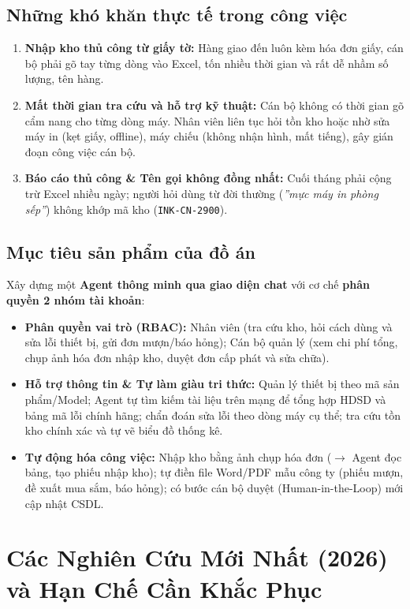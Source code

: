 \documentclass[11pt,a4paper]{article}
\begin{document}
\subsection{Những khó khăn thực tế trong công việc}
\begin{enumerate}
    \item \textbf{Nhập kho thủ công từ giấy tờ:} Hàng giao đến luôn kèm hóa đơn giấy, cán bộ phải gõ tay từng dòng vào Excel, tốn nhiều thời gian và rất dễ nhầm số lượng, tên hàng.
    \item \textbf{Mất thời gian tra cứu và hỗ trợ kỹ thuật:} Cán bộ không có thời gian gõ cẩm nang cho từng dòng máy. Nhân viên liên tục hỏi tồn kho hoặc nhờ sửa máy in (kẹt giấy, offline), máy chiếu (không nhận hình, mất tiếng), gây gián đoạn công việc cán bộ.
    \item \textbf{Báo cáo thủ công \& Tên gọi không đồng nhất:} Cuối tháng phải cộng trừ Excel nhiều ngày; người hỏi dùng từ đời thường (\textit{''mực máy in phòng sếp''}) không khớp mã kho (\texttt{INK-CN-2900}).
\end{enumerate}

\subsection{Mục tiêu sản phẩm của đồ án}
Xây dựng một \textbf{Agent thông minh qua giao diện chat} với cơ chế \textbf{phân quyền 2 nhóm tài khoản}:
\begin{itemize}
    \item \textbf{Phân quyền vai trò (RBAC):} Nhân viên (tra cứu kho, hỏi cách dùng và sửa lỗi thiết bị, gửi đơn mượn/báo hỏng); Cán bộ quản lý (xem chi phí tổng, chụp ảnh hóa đơn nhập kho, duyệt đơn cấp phát và sửa chữa).
    \item \textbf{Hỗ trợ thông tin \& Tự làm giàu tri thức:} Quản lý thiết bị theo mã sản phẩm/Model; Agent tự tìm kiếm tài liệu trên mạng để tổng hợp HDSD và bảng mã lỗi chính hãng; chẩn đoán sửa lỗi theo dòng máy cụ thể; tra cứu tồn kho chính xác và tự vẽ biểu đồ thống kê.
    \item \textbf{Tự động hóa công việc:} Nhập kho bằng ảnh chụp hóa đơn ($\rightarrow$ Agent đọc bảng, tạo phiếu nhập kho); tự điền file Word/PDF mẫu công ty (phiếu mượn, đề xuất mua sắm, báo hỏng); có bước cán bộ duyệt (Human-in-the-Loop) mới cập nhật CSDL.
\end{itemize}

\section{Các Nghiên Cứu Mới Nhất (2026) và Hạn Chế Cần Khắc Phục}
\end{document}
